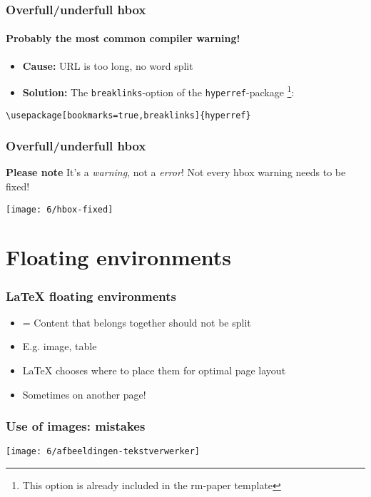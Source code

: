 \documentclass[aspectratio=169]{beamer}
\begin{document}
\begin{frame}[fragile]
  \frametitle{Overfull/underfull hbox}
  \framesubtitle{Probably the most common compiler warning!}

  \begin{itemize}
    \item \textbf{Cause:} URL is too long, no word split
    \item \textbf{Solution:} The \texttt{breaklinks}-option of the \texttt{hyperref}-package \footnote{This option is already included in the rm-paper template}:
  \end{itemize}

\begin{verbatim}
\usepackage[bookmarks=true,breaklinks]{hyperref}
\end{verbatim}
\end{frame}

\begin{frame}
  \frametitle{Overfull/underfull hbox}

    \textbf{Please note} It's a \emph{warning}, not a \emph{error}! Not every hbox warning needs to be fixed!

  \centering
  \texttt{[image: 6/hbox-fixed]}

\end{frame}

\section{Floating environments}

\begin{frame}
  \frametitle{{\LaTeX} floating environments}

  \begin{itemize}
   \item = Content that belongs together should not be split
   \item E.g. image, table
   \item {\LaTeX} chooses where to place them for optimal page layout
   \item Sometimes on another page!
  \end{itemize}

\end{frame}

\begin{frame}
  \frametitle{Use of images: mistakes}

  \centering
  \texttt{[image: 6/afbeeldingen-tekstverwerker]}

\end{frame}
\end{document}
